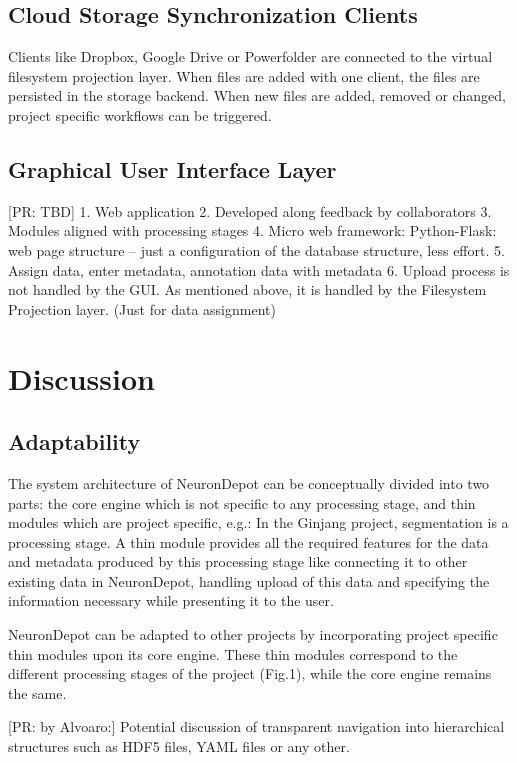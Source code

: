 \documentclass{frontiersSCNS} %
\newcommand{\pr}[1]{[\textcolor{YellowOrange}{PR: #1}]}
\begin{document}
\subsection{Cloud Storage Synchronization Clients}

Clients like Dropbox, Google Drive or Powerfolder are connected to the virtual
filesystem projection layer. When files are added with one client, the files
are persisted in the storage backend. When new files are added, removed or
changed, project specific workflows can be triggered.


\subsection{Graphical User Interface Layer}

\pr{TBD}
1. Web application
2. Developed along feedback by collaborators
3. Modules aligned with processing stages
4. Micro web framework: Python-Flask: web page structure – just a configuration of the database structure, less effort.
5. Assign data, enter metadata, annotation data with metadata
6. Upload process is not handled by the GUI. As mentioned above, it is handled by the Filesystem Projection layer. (Just for data assignment)


\section{Discussion}

\subsection{Adaptability}
The system architecture of NeuronDepot can be conceptually divided into two
parts: the core engine which is not specific to any processing stage, and thin
modules which are project specific, e.g.: In the Ginjang project, segmentation
is a processing stage. A thin module provides all the required features for the
data and metadata produced by this processing stage like connecting it to other
existing data in NeuronDepot, handling upload of this data and specifying the
information necessary while presenting it to the user.

NeuronDepot can be adapted to other projects by incorporating project specific
thin modules upon its core engine. These thin modules correspond to the
different processing stages of the project (Fig.1), while the core engine
remains the same.

\pr{by Alvoaro:} Potential discussion of transparent navigation into hierarchical structures such as HDF5 files, YAML files or any other.
\end{document}
